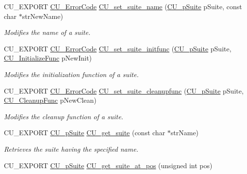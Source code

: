 \begin{DoxyCompactItemize}
C\-U\-\_\-\-E\-X\-P\-O\-R\-T \hyperlink{group__Framework_ga743a2a025ee3eb792d7d85f0eea347e6}{C\-U\-\_\-\-Error\-Code} \hyperlink{group__Framework_gad5b331a1610c200c838243b37db681cc}{C\-U\-\_\-set\-\_\-suite\-\_\-name} (\hyperlink{group__Framework_gaba832ae8b235f5e70d6a4ac9c3bb1219}{C\-U\-\_\-p\-Suite} p\-Suite, const char $\ast$str\-New\-Name)
\begin{DoxyCompactList}\small\item\em Modifies the name of a suite. \end{DoxyCompactList}\item 
C\-U\-\_\-\-E\-X\-P\-O\-R\-T \hyperlink{group__Framework_ga743a2a025ee3eb792d7d85f0eea347e6}{C\-U\-\_\-\-Error\-Code} \hyperlink{group__Framework_ga5b46212acfeaa883a8afd69e8c02aff9}{C\-U\-\_\-set\-\_\-suite\-\_\-initfunc} (\hyperlink{group__Framework_gaba832ae8b235f5e70d6a4ac9c3bb1219}{C\-U\-\_\-p\-Suite} p\-Suite, \hyperlink{group__Framework_gaab4b8ad3aa3a3c222c43c8a330de11e3}{C\-U\-\_\-\-Initialize\-Func} p\-New\-Init)
\begin{DoxyCompactList}\small\item\em Modifies the initialization function of a suite. \end{DoxyCompactList}\item 
C\-U\-\_\-\-E\-X\-P\-O\-R\-T \hyperlink{group__Framework_ga743a2a025ee3eb792d7d85f0eea347e6}{C\-U\-\_\-\-Error\-Code} \hyperlink{group__Framework_ga6f7d29b9c41b17005b4792e31bfe721f}{C\-U\-\_\-set\-\_\-suite\-\_\-cleanupfunc} (\hyperlink{group__Framework_gaba832ae8b235f5e70d6a4ac9c3bb1219}{C\-U\-\_\-p\-Suite} p\-Suite, \hyperlink{group__Framework_ga90966c0bede742195897c3aeff4c342b}{C\-U\-\_\-\-Cleanup\-Func} p\-New\-Clean)
\begin{DoxyCompactList}\small\item\em Modifies the cleanup function of a suite. \end{DoxyCompactList}\item 
C\-U\-\_\-\-E\-X\-P\-O\-R\-T \hyperlink{group__Framework_gaba832ae8b235f5e70d6a4ac9c3bb1219}{C\-U\-\_\-p\-Suite} \hyperlink{group__Framework_ga58e560d695d4f6fdec8f2f2c9805bfcd}{C\-U\-\_\-get\-\_\-suite} (const char $\ast$str\-Name)
\begin{DoxyCompactList}\small\item\em Retrieves the suite having the specified name. \end{DoxyCompactList}\item 
C\-U\-\_\-\-E\-X\-P\-O\-R\-T \hyperlink{group__Framework_gaba832ae8b235f5e70d6a4ac9c3bb1219}{C\-U\-\_\-p\-Suite} \hyperlink{group__Framework_ga66cbc0f181722251ac52a28eb26e7886}{C\-U\-\_\-get\-\_\-suite\-\_\-at\-\_\-pos} (unsigned int pos)

\end{DoxyCompactItemize}
